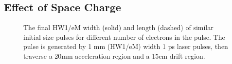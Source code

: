 \subsection{Effect of Space Charge} \label{sec:free_spacecharge}

\begin{figure}
  \centering
  \begin{tikzpicture}
    
  \end{tikzpicture}
  \caption{
    The final HW1/eM width (solid) and length (dashed)  of similar initial size pulses for different number of electrons in the pulse.
    The pulse is generated by 1 mm (HW1/eM) width 1 ps laser pulses, then traverse a 20mm acceleration region and a 15cm drift region.
  }
  \label{fig:spacecharge}
\end{figure}


